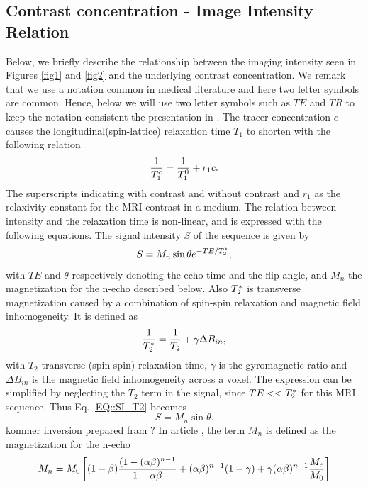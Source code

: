 \documentclass[11pt,a4paper]{article}
\begin{document}
\subsection{Contrast concentration - Image Intensity Relation}
Below, we briefly describe the relationship between the imaging intensity 
seen in Figures \ref{fig1} and \ref{fig2} and the underlying contrast 
concentration. We remark that we use a notation common in medical literature and here two letter symbols are common. Hence, below we will use two letter symbols such as $TE$ and $TR$ to keep the notation consistent the presentation in \cite{GOWLAND}\cite{MPRAGE}.   
The tracer concentration $c$ causes the longitudinal(spin-lattice) relaxation time $T_{1}$ to shorten with the following relation
\begin{equation}
\frac{1}{T_{1}\sp{c}} = \frac{1}{T_{1}\sp{0}} + r_{1}c .
\label{EQ::contrast}
\end{equation}
The superscripts indicating with contrast and without contrast and $r_1$ as the relaxivity constant for the MRI-contrast in a medium. The relation between intensity and the relaxation time is non-linear, and is expressed with the following equations. The signal intensity $S$ of the sequence is given by
\begin{equation}
S = M_{n} \sin \theta e\sp{ - TE/T_2\sp{*} },
\label{EQ::SI_T2}
\end{equation}
with $TE$ and $\theta$ respectively denoting the echo time and the flip angle, and $M_{n}$ the magnetization for the n-echo described below. 
Also $T_2\sp{*}$ is transverse magnetization caused by a combination of spin-spin relaxation and magnetic field inhomogeneity. It is defined as 
\begin{equation}
\frac{1}{T_2\sp{*}} = \frac{1}{T_2} + \gamma \Delta B_{in} ,
\end{equation}
with $T_2$ transverse (spin-spin) relaxation time, $\gamma$ is the gyromagnetic ratio and $\Delta B_{in}$ is the magnetic field inhomogeneity across a voxel. The expression can be simplified by neglecting the $T_2$ term in the signal, since $TE <<T_2\sp{*}$ for this MRI sequence. Thus Eq. \ref{EQ::SI_T2} becomes 
\begin{equation}
S = M_{n} \sin \theta.
\label{EQ::SI}
\end{equation}
{\color{red} kommer inversion prepared fram ?}
In article \cite{GOWLAND}, the term $M_n$ is defined as the magnetization for the n-echo 
\begin{equation}
M_{n} = M_{0}  \left[ (1-\beta)\frac{(1-(\alpha \beta)\sp{n-1} }{1-\alpha\beta} + (\alpha \beta)\sp{n-1}(1-\gamma) + \gamma ( \alpha \beta)\sp{n-1} \frac{M_{e}}{M_{0}}  \right]   
\end{equation}
\end{document}
